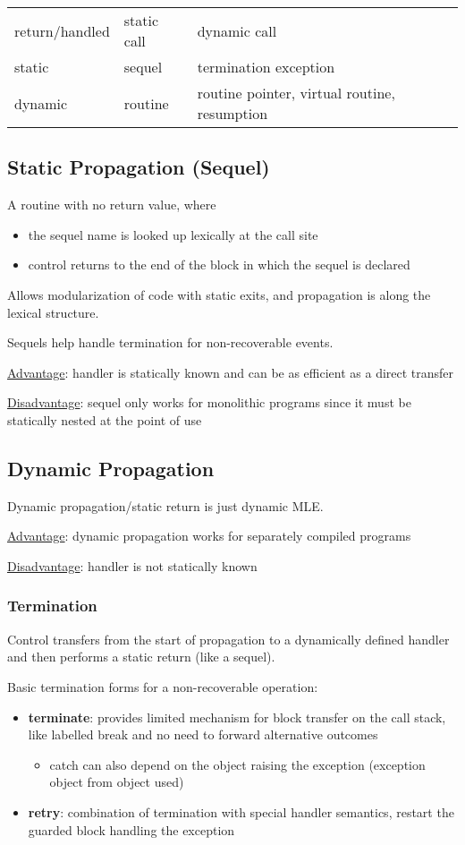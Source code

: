 \documentclass[11pt]{article}
\begin{document}
\begin{center}
\begin{tabular}{lll}
return/handled & static call & dynamic call\\
static & sequel & termination exception\\
dynamic & routine & routine pointer, virtual routine, resumption\\
\end{tabular}
\end{center}
\subsection{Static Propagation (Sequel)}
\label{sec:orge44c519}
A routine with no return value, where
\begin{itemize}
\item the sequel name is looked up lexically at the call site
\item control returns to the end of the block in which the sequel is declared
\end{itemize}

Allows modularization of code with static exits, and propagation is along the lexical structure.

Sequels help handle termination for non-recoverable events.

\uline{Advantage}: handler is statically known and can be as efficient as a direct transfer

\uline{Disadvantage}: sequel only works for monolithic programs since it must be statically nested at
the point of use
\subsection{Dynamic Propagation}
\label{sec:org7d64108}
Dynamic propagation/static return is just dynamic MLE.

\uline{Advantage}: dynamic propagation works for separately compiled programs

\uline{Disadvantage}: handler is not statically known
\subsubsection{Termination}
\label{sec:orgff680c6}
Control transfers from the start of propagation to a dynamically defined handler and then
performs a static return (like a sequel).

Basic termination forms for a non-recoverable operation:
\begin{itemize}
\item \textbf{terminate}: provides limited mechanism for block transfer on the call stack, like labelled break
and no need to forward alternative outcomes
\begin{itemize}
\item catch can also depend on the object raising the exception (exception object from object used)
\end{itemize}
\item \textbf{retry}: combination of termination with special handler semantics, restart the guarded block
handling the exception
\end{itemize}
\end{document}

